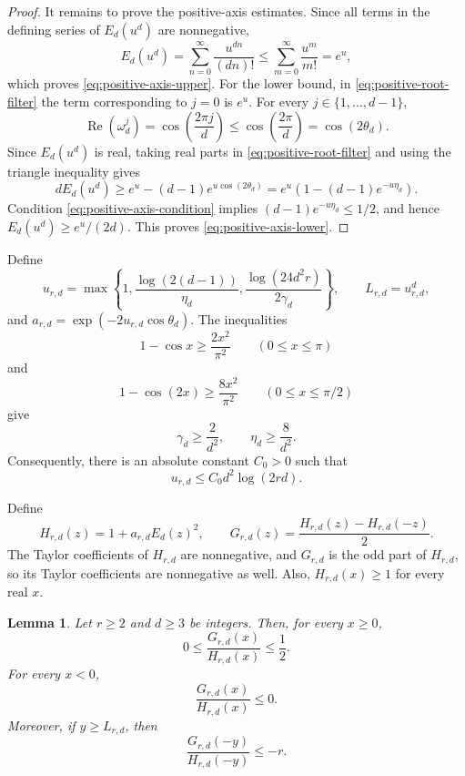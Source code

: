\documentclass[twoside,12pt]{article}
\newtheorem{lemma}[theorem]{Lemma}
\theoremstyle{definition}
\theoremstyle{remark}
\newcommand{\1}{\mathbf 1}
\begin{document}
\begin{proof}
It remains to prove the positive-axis estimates. Since all terms in the
defining series of $E_d(u^d)$ are nonnegative,
\[
 E_d(u^d)
 =\sum_{n=0}^{\infty}\frac{u^{dn}}{(dn)!}
 \le\sum_{m=0}^{\infty}\frac{u^m}{m!}=e^u,
\]
which proves \eqref{eq:positive-axis-upper}. For the lower bound, in
\eqref{eq:positive-root-filter} the term corresponding to $j=0$ is $e^u$.
For every $j\in\{1,\ldots,d-1\}$,
\[
 \operatorname{Re}(\omega_d^j)
 =\cos\!\left(\frac{2\pi j}{d}\right)
 \le\cos\!\left(\frac{2\pi}{d}\right)=\cos(2\theta_d).
\]
Since $E_d(u^d)$ is real, taking real parts in
\eqref{eq:positive-root-filter} and using the triangle inequality gives
\[
 dE_d(u^d)
 \ge e^u-(d-1)e^{u\cos(2\theta_d)}
 =e^u\left(1-(d-1)e^{-u\eta_d}\right).
\]
Condition \eqref{eq:positive-axis-condition} implies
$(d-1)e^{-u\eta_d}\le1/2$, and hence
$E_d(u^d)\ge e^u/(2d)$. This proves
\eqref{eq:positive-axis-lower}.
\end{proof}

Define
\[
 u_{r,d}=\max\left\{
 1,
 \frac{\log(2(d-1))}{\eta_d},
 \frac{\log(24d^2r)}{2\gamma_d}
 \right\},
 \qquad
 L_{r,d}=u_{r,d}^d,
\]
and
$a_{r,d}=\exp(-2u_{r,d}\cos\theta_d)$.
The inequalities
\[
 1-\cos x\ge\frac{2x^2}{\pi^2}
 \qquad(0\le x\le\pi)
\]
and
\[
 1-\cos(2x)\ge\frac{8x^2}{\pi^2}
 \qquad(0\le x\le\pi/2)
\]
give
\[
 \gamma_d\ge\frac{2}{d^2},
 \qquad
 \eta_d\ge\frac{8}{d^2}.
\]
Consequently, there is an absolute constant $C_0>0$ such that
\begin{equation}\label{eq:urd-bound}
 u_{r,d}\le C_0d^2\log(2rd).
\end{equation}

Define
\[
 H_{r,d}(z)=1+a_{r,d}E_d(z)^2,
 \qquad
 G_{r,d}(z)=\frac{H_{r,d}(z)-H_{r,d}(-z)}2.
\]
The Taylor coefficients of $H_{r,d}$ are nonnegative, and $G_{r,d}$ is the
odd part of $H_{r,d}$, so its Taylor coefficients are nonnegative as well.
Also, $H_{r,d}(x)\ge1$ for every real $x$.

\begin{lemma}\label{lem:ratio-estimates}
Let $r\ge2$ and $d\ge3$ be integers. Then, for every $x\ge0$,
\[
 0\le\frac{G_{r,d}(x)}{H_{r,d}(x)}\le\frac12.
\]
For every $x<0$,
\[
 \frac{G_{r,d}(x)}{H_{r,d}(x)}\le0.
\]
Moreover, if $y\ge L_{r,d}$, then
\[
 \frac{G_{r,d}(-y)}{H_{r,d}(-y)}\le-r.
\]
\end{lemma}
\end{document}
